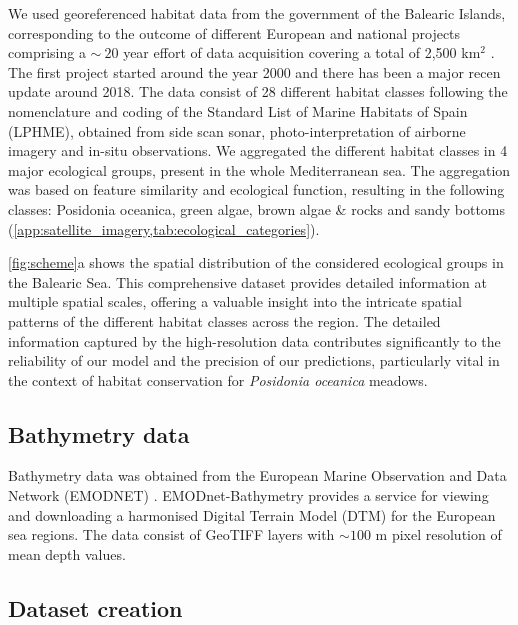 We used georeferenced habitat data from the government of the Balearic
Islands, corresponding to the outcome of different European and national
projects comprising a $\sim~20$ year effort of data acquisition covering a
total of 2,500 km$^2$ \cite{cartografia,ValleVillalonga2023}.
The first
project started
around the year
2000 and there has been a major recen update around 2018. The data consist of
28 different habitat classes following the nomenclature and coding of the
Standard List of Marine Habitats of Spain (LPHME), obtained from side scan
sonar, photo-interpretation of airborne imagery and in-situ observations. We
aggregated the different habitat classes in 4 major ecological groups, present
in the whole Mediterranean sea. The aggregation was based on feature similarity
and ecological function, resulting in the following classes: Posidonia
oceanica, green algae, brown algae \& rocks and sandy bottoms
(\cref{app:satellite_imagery,tab:ecological_categories}).

\cref{fig:scheme}a shows the spatial distribution of the considered ecological
groups in the Balearic Sea. This comprehensive dataset provides detailed
information at multiple spatial scales, offering a valuable insight into the
intricate spatial patterns of the different habitat classes across the region.
The detailed information captured by the high-resolution data contributes
significantly to the reliability of our model and the precision of our
predictions, particularly vital in the context of habitat
conservation for \textit{Posidonia oceanica} meadows.

\subsection{Bathymetry data}

Bathymetry data was obtained from the European Marine Observation and Data
Network (EMODNET) \cite{emodnet}. EMODnet-Bathymetry provides a service for
viewing and downloading a harmonised Digital Terrain Model (DTM) for the
European sea regions. The data consist of GeoTIFF layers with $\sim100$ m pixel
resolution of mean depth values.

\subsection{Dataset creation}


